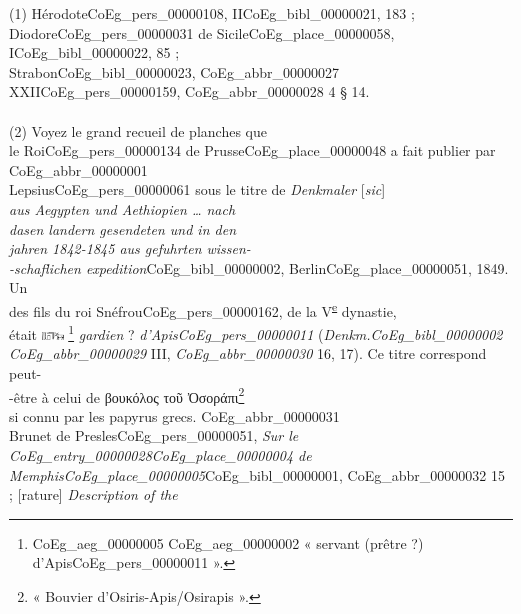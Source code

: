 \documentclass{book}
\begin{document}
{\begin{paracol}{2}
\noindent \\
\\
\\
\\
\\
(1) Hérodote\gls{CoEg_pers_00000108}, II\gls{CoEg_bibl_00000021}, 183 ; Diodore\gls{CoEg_pers_00000031} de Sicile\gls{CoEg_place_00000058}, I\gls{CoEg_bibl_00000022}, 85 ;\\
Strabon\gls{CoEg_bibl_00000023}, \gls{CoEg_abbr_00000027} XXII\gls{CoEg_pers_00000159}, \gls{CoEg_abbr_00000028} 4 § 14.\\
\\
(2) Voyez le grand recueil de planches que\\
le Roi\gls{CoEg_pers_00000134} de Prusse\gls{CoEg_place_00000048} a fait publier par \gls{CoEg_abbr_00000001}\\
Lepsius\gls{CoEg_pers_00000061} sous le titre de \textit{Denkmaler} [\textit{sic}]\\
\textit{aus Aegypten und Aethiopien … nach\\
dasen landern gesendeten und in den\\
jahren 1842-1845 aus gefuhrten wissen-\\
-schaflichen expedition}\gls{CoEg_bibl_00000002}, Berlin\gls{CoEg_place_00000051}, 1849. Un\\
des fils du roi Snéfrou\gls{CoEg_pers_00000162}, de la V\textsuperscript{\underline{e}} dynastie,\\
était \includegraphics[height=6pt]{CoEg_Mariette_hiero_1857-04-01_4_1.png} \footnote{\foreignlanguage{translit}{\Gls{CoEg_aeg_00000005} \gls{CoEg_aeg_00000002}} « servant (prêtre ?) d’Apis\gls{CoEg_pers_00000011} ».} \textit{gardien} ? \textit{d’Apis\gls{CoEg_pers_00000011}} (\textit{Denkm.\gls{CoEg_bibl_00000002}\\
\gls{CoEg_abbr_00000029}} III, \textit{\gls{CoEg_abbr_00000030}} 16, 17). Ce titre correspond peut-\\
-être à celui de βουκόλος τοῦ Ὀσοράπι\footnote{« Bouvier d’Osiris-Apis/Osirapis ».}\\
si connu par les papyrus grecs. \Gls{CoEg_abbr_00000031}\\
Brunet de Presles\gls{CoEg_pers_00000051}, \textit{Sur le \Gls{CoEg_entry_00000028}\gls{CoEg_place_00000004} de\\
Memphis\gls{CoEg_place_00000005}}\gls{CoEg_bibl_00000001}, \gls{CoEg_abbr_00000032} 15 ; [rature] \textit{Description of the\\
}
\end{paracol}}
\end{document}
